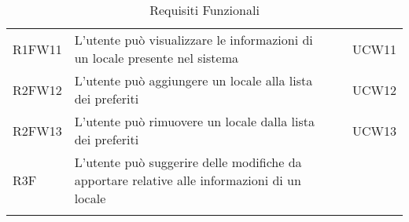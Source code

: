 \begin{longtable}{ m{}<{\centering}  m{}<{\centering}  m{}<{\centering}  m{}<{\centering}}
	R1FW11 & L’utente può visualizzare le informazioni di un locale presente nel sistema & \Ob & UCW11\\	 	 	 	

	R2FW12 & L’utente può aggiungere un locale alla lista dei preferiti & \De &  UCW12\\

	R2FW13 & L’utente può rimuovere un locale dalla lista dei preferiti & \De & UCW13\\

	R3F & L’utente può suggerire delle modifiche da apportare relative alle informazioni di un locale & \Fa & \Di \\

	\hiderowcolors \caption{Requisiti Funzionali}
\end{longtable}

\clearpage